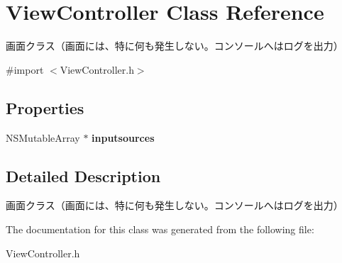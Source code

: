 \hypertarget{interface_view_controller}{\section{View\-Controller Class Reference}
\label{interface_view_controller}
}


画面クラス（画面には、特に何も発生しない。コンソールへはログを出力）  




{\ttfamily \#import $<$View\-Controller.\-h$>$}

\subsection*{Properties}
\begin{DoxyCompactItemize}
\item 
\hypertarget{interface_view_controller_a031b01660191b56a759dc3a595f0708e}{N\-S\-Mutable\-Array $\ast$ {\bfseries inputsources}}\label{interface_view_controller_a031b01660191b56a759dc3a595f0708e}

\end{DoxyCompactItemize}


\subsection{Detailed Description}
画面クラス（画面には、特に何も発生しない。コンソールへはログを出力） 

The documentation for this class was generated from the following file\-:\begin{DoxyCompactItemize}
\item 
View\-Controller.\-h\end{DoxyCompactItemize}
